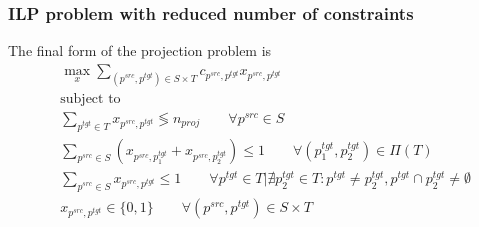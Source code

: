 \documentclass{beamer}
\newcommand{\src}[1]{#1^{src}}
\newcommand{\tgt}[1]{#1^{tgt}}
\begin{document}
\begin{frame}
  \frametitle{ILP problem with reduced number of constraints}
  The final form of the projection problem is
  \begin{align*}
    & \max\limits_x \sum\limits_{(\src{p}, \tgt{p}) \in S \times T} c_{\src{p}, \tgt{p}} x_{\src{p}, \tgt{p}}                                                                                                                       \\
    & \text{subject to}                                                                                                                                                                                                             \\
    & \sum\limits_{\tgt{p} \in T} x_{\src{p}, \tgt{p}} \lessgtr n_{proj}
    \qquad \forall \src{p} \in S                                                                                               \\
    & \sum\limits_{\src{p} \in S} (x_{\src{p}, \tgt{p_1}} + x_{\src{p}, \tgt{p_2}}) \leq 1
    \qquad \forall (\tgt{p_1}, \tgt{p_2}) \in \Pi(T)                                                                           \\
    & \sum\limits_{\src{p} \in S} x_{\src{p}, \tgt{p}} \leq 1
    \qquad \forall \tgt{p} \in T \Big| \nexists \tgt{p_2} \in T: \tgt{p} \neq \tgt{p_2}, \tgt{p} \cap \tgt{p_2} \neq \emptyset \\
    & x_{\src{p}, \tgt{p}} \in \{ 0, 1 \}
    \qquad \forall (\src{p}, \tgt{p}) \in S \times T
  \end{align*}
\end{frame}
\end{document}

